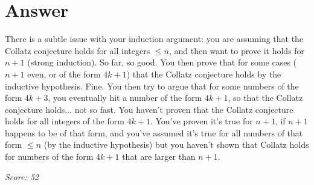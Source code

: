 \documentclass{article}
\begin{document}
\section*{Answer}
There is a subtle issue with your induction argument: you are assuming that the Collatz conjecture holds for all integers $\leq n$, and then want to prove it holds for $n+1$ (strong induction). So far, so good. You then prove that for some cases ($n+1$ even, or of the form $4k+1$) that the Collatz conjecture holds by the inductive hypothesis. Fine. You then try to argue that for some numbers of the form $4k+3$, you eventually hit a number of the form $4k+1$, so that the Collatz conjecture holds... not so fast. You haven't proven that the Collatz conjecture holds for all integers of the form $4k+1$. You've proven it's true for $n+1$, if $n+1$ happens to be of that form, and you've assumed it's true for all numbers of that form $\leq n$ (by the inductive hypothesis) but you haven't shown that Collatz holds for numbers of the form $4k+1$ that are larger than $n+1$.

\vspace{1em}
\noindent\textit{Score: 52}
\end{document}
